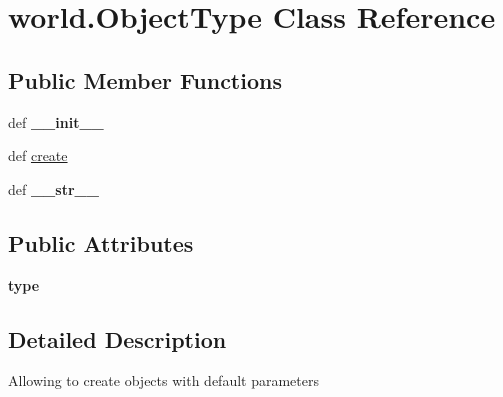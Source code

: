 \hypertarget{classworld_1_1_object_type}{\section{world.\-Object\-Type \-Class \-Reference}
\label{classworld_1_1_object_type}
}
\subsection*{\-Public \-Member \-Functions}
\begin{DoxyCompactItemize}
\item 
\hypertarget{classworld_1_1_object_type_a8e22b69e8867f70d768f1c29b5d67299}{def {\bfseries \-\_\-\-\_\-init\-\_\-\-\_\-}}\label{classworld_1_1_object_type_a8e22b69e8867f70d768f1c29b5d67299}

\item 
def \hyperlink{classworld_1_1_object_type_aec3659e529c2f58cc8ec05a759811015}{create}
\item 
\hypertarget{classworld_1_1_object_type_a338113a75208a1dd1ff1e3a60fcc2dbb}{def {\bfseries \-\_\-\-\_\-str\-\_\-\-\_\-}}\label{classworld_1_1_object_type_a338113a75208a1dd1ff1e3a60fcc2dbb}

\end{DoxyCompactItemize}
\subsection*{\-Public \-Attributes}
\begin{DoxyCompactItemize}
\item 
\hypertarget{classworld_1_1_object_type_ae9880fda72c8950d1b1b070efa72279e}{{\bfseries type}}\label{classworld_1_1_object_type_ae9880fda72c8950d1b1b070efa72279e}

\end{DoxyCompactItemize}


\subsection{\-Detailed \-Description}
\begin{DoxyVerb}Allowing to create objects with default parameters \end{DoxyVerb}
 

